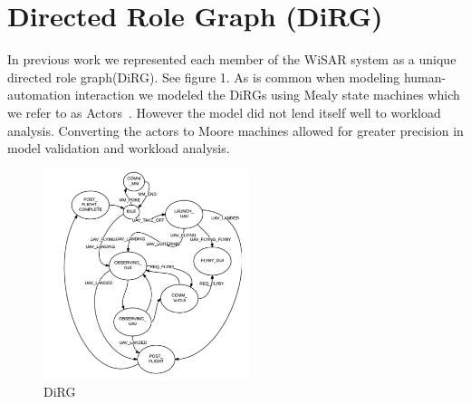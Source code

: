 \section{Directed Role Graph (DiRG)}

In previous work we represented each member of the WiSAR system as a unique directed role graph(DiRG). See figure 1. As is common
when modeling human-automation interaction we modeled the DiRGs using Mealy state machines which we refer to as Actors~\cite{bolton2013litreview}. However the model did not lend itself well to workload analysis. Converting the actors to Moore machines allowed for greater precision in model validation and workload analysis.

\begin{figure}[h]
\center
\setlength{\abovecaptionskip}{1mm}
\setlength{\belowcaptionskip}{1mm}
\setlength{\textfloatsep}{1mm}
\setlength{\floatsep}{1mm}
\includegraphics[height=2.4in]{DiRG.png}
\caption{DiRG}
\label{fig:dirg}
\end{figure}